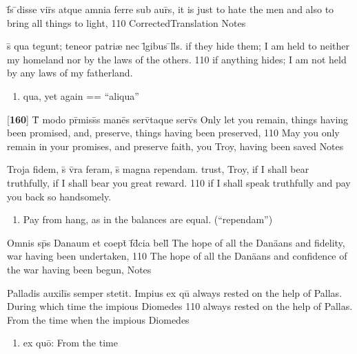 \latline
  {f\={}s \={}disse vir\={}s atque amnia ferre sub aur\={}s,}
  { it is just to hate the men and also to bring all things to light, }
  {110}
  { CorrectedTranslation }
  { Notes }


\latline
  {s\={\macron {\i}} qua tegunt; teneor patri{\ae} nec l\={}gibus \={}ll\={\macron {\i}}s.  }
  { if they hide them; I am held to neither my homeland nor by the laws of the others. }    
  {110}                                                                                     
  { if anything hides; I am not held by any laws of my fatherland. }
  { \begin{enumerate}
  	\item qua, yet again == ``aliqua''
  \end{enumerate} }


\latline
  {[\textbf{160}] T\={} modo pr\={}miss\={\macron {\i}}s mane\={}s serv\={}taque serv\={}s}
  { Only let you remain, things having been promised, and, preserve, things having been preserved,     }
  {110}
  { May you only remain in your promises, and preserve faith, you Troy, having been saved  }
  { Notes }


\latline
  {Troja fidem, s\={\macron {\i}} v\={}ra feram, s\={\macron {\i}} magna rependam.}
  {trust, Troy, if I shall bear truthfully, if I shall bear you great reward. }
  {110}
  { if I shall speak truthfully and pay you back so handsomely. }
  { \begin{enumerate}
  	\item Pay from hang, as in the balances are equal. (``rependam'')
  \end{enumerate} }


\latline
  {Omnis sp\={}s Danaum et coept\={\macron {\i}} f\={\macron {\i}}d\={}cia bell\={\macron {\i}}}
  { The hope of all the Dan\"aans and fidelity, war having been undertaken,  }    
  {110}
  { The hope of all the Dan\"aans and confidence of the war having been begun,  }
  { Notes }


\latline
  {Palladis auxili\={\macron {\i}}s semper stetit.  Impius ex qu\={}}
  { always rested on the help of Pallas.  During which time the impious Diomedes  }
  {110}
  { always rested on the help of Pallas.  From the time when the impious Diomedes  }
  { \begin{enumerate}
  	\item ex qu\={o}:  From the time
  \end{enumerate} }


